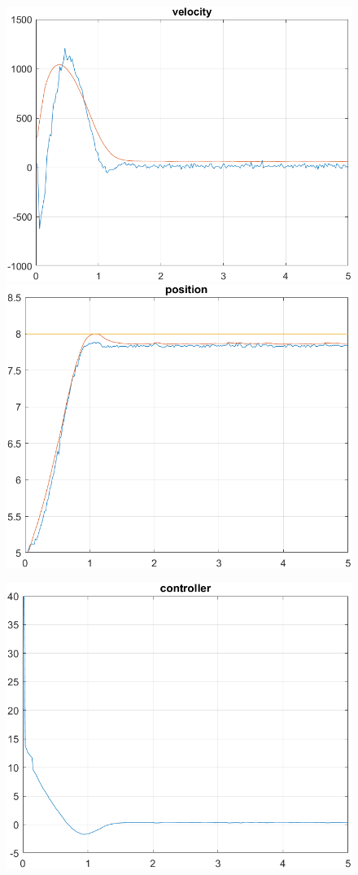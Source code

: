 \begin{figure}[H]
    \centering
    \begin{minipage}{0.45\textwidth}
        \includegraphics[width=\linewidth]{Images/lab4/2/vel422.png}
    \end{minipage}
    \hfill
    \begin{minipage}{0.45\textwidth}
        \includegraphics[width=\linewidth]{Images/lab4/2/pos422.png}
    \end{minipage}
\end{figure}
\begin{figure}[H]
    \centering
    \includegraphics[width=0.5\linewidth]{Images/lab4/2/con422.png}
\end{figure}
